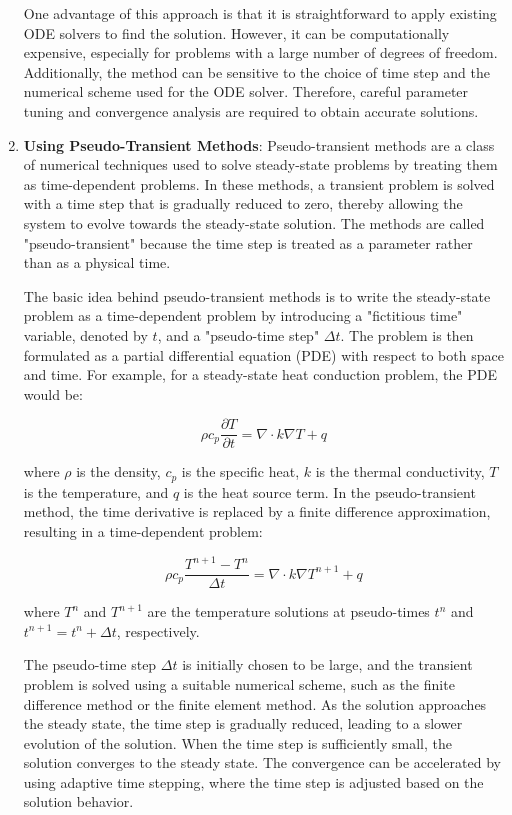 \begin{enumerate}
        One advantage of this approach is that it is straightforward to apply existing ODE solvers to find the solution. However, it can be computationally expensive, especially for problems with a large number of degrees of freedom. Additionally, the method can be sensitive to the choice of time step and the numerical scheme used for the ODE solver. Therefore, careful parameter tuning and convergence analysis are required to obtain accurate solutions.
  \item \textbf{Using Pseudo-Transient Methods}:  Pseudo-transient methods are a class of numerical techniques used to solve steady-state problems by treating them as time-dependent problems. In these methods, a transient problem is solved with a time step that is gradually reduced to zero, thereby allowing the system to evolve towards the steady-state solution. The methods are called "pseudo-transient" because the time step is treated as a parameter rather than as a physical time.

        The basic idea behind pseudo-transient methods is to write the steady-state problem as a time-dependent problem by introducing a "fictitious time" variable, denoted by $t$, and a "pseudo-time step" $\Delta t$. The problem is then formulated as a partial differential equation (PDE) with respect to both space and time. For example, for a steady-state heat conduction problem, the PDE would be:

        \begin{equation}
          \rho c_p \frac{\partial T}{\partial t} = \nabla \cdot k \nabla T + q
        \end{equation}

        where $\rho$ is the density, $c_p$ is the specific heat, $k$ is the thermal conductivity, $T$ is the temperature, and $q$ is the heat source term. In the pseudo-transient method, the time derivative is replaced by a finite difference approximation, resulting in a time-dependent problem:

        \begin{equation}
          \rho c_p \frac{T^{n+1} - T^n}{\Delta t} = \nabla \cdot k \nabla T^{n+1} + q
        \end{equation}

        where $T^n$ and $T^{n+1}$ are the temperature solutions at pseudo-times $t^n$ and $t^{n+1} = t^n + \Delta t$, respectively.

        The pseudo-time step $\Delta t$ is initially chosen to be large, and the transient problem is solved using a suitable numerical scheme, such as the finite difference method or the finite element method. As the solution approaches the steady state, the time step is gradually reduced, leading to a slower evolution of the solution. When the time step is sufficiently small, the solution converges to the steady state. The convergence can be accelerated by using adaptive time stepping, where the time step is adjusted based on the solution behavior.


\end{enumerate}
